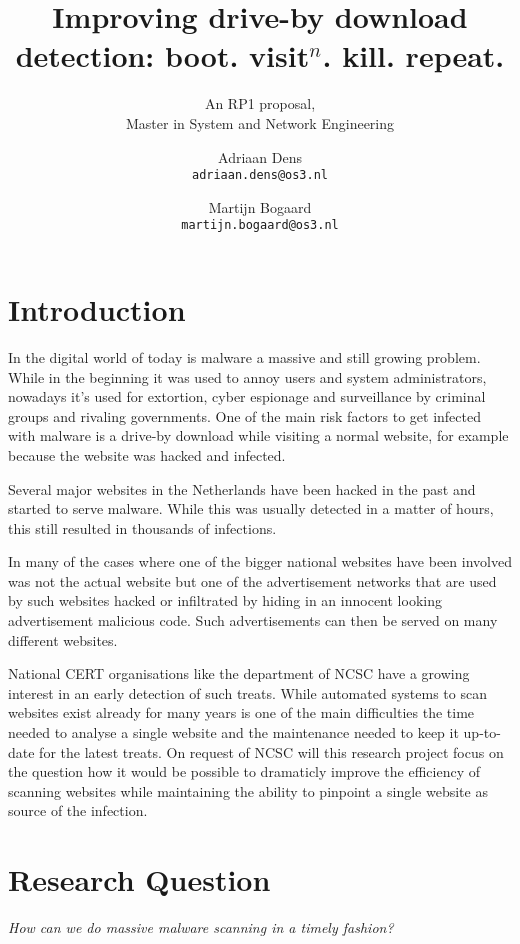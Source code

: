 \documentclass{scrartcl}
\title{Improving drive-by download detection: boot. visit$^n$. kill. repeat.}
\subtitle{An RP1 proposal,\\Master in System and Network Engineering}
\author{
  Adriaan Dens\\
   \texttt{adriaan.dens@os3.nl}
  \and
  Martijn Bogaard\\
   \texttt{martijn.bogaard@os3.nl}
}
\begin{document}
\maketitle

\section{Introduction}

In the digital world of today is malware a massive and still growing problem. While in the beginning it was used to annoy users and system administrators, nowadays it's used for extortion, cyber espionage and surveillance by criminal groups and rivaling governments. One of the main risk factors to get infected with malware is a drive-by download while visiting a normal website, for example because the website was hacked and infected. 

Several major websites in the Netherlands have been hacked in the past and started to serve malware. While this was usually detected in a matter of hours, this still resulted in thousands of infections.

In many of the cases where one of the bigger national websites have been involved was not the actual website but one of the advertisement networks that are used by such websites hacked or infiltrated by hiding in an innocent looking advertisement malicious code. Such advertisements can then be served on many different websites.

National CERT organisations like the department of NCSC have a growing interest in an early detection of such treats. While automated systems to scan websites exist already for many years is one of the main difficulties the time needed to analyse a single website and the maintenance needed to keep it up-to-date for the latest treats. On request of NCSC will this research project focus on the question how it would be possible to dramaticly improve the efficiency of scanning websites while maintaining the ability to pinpoint a single website as source of the infection.

\section{Research Question}

\textit{How can we do massive malware scanning in a timely fashion?}



\end{document}
